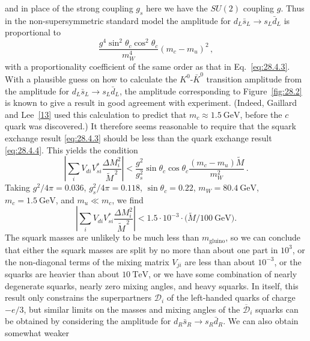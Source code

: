 and in place of the strong coupling \(g_s\) here we have the \(SU(2)\)
coupling \(g\). Thus in the non-supersymmetric standard model the
amplitude for
\(d_L\bar{s}_L\longrightarrow s_L\bar{d}_L\) is proportional to
\begin{equation}
  \frac{g^4\sin^2\theta_c\cos^2\theta_c}{m_W^4}
  (m_c-m_u)^2\,,
  \tag{28.4.4}\label{eq:28.4.4}
\end{equation}
with a proportionality coefficient of the same order as that in
Eq.~\eqref{eq:28.4.3}. With a plausible guess on how to calculate the
\(K^0\)-\(\bar K^0\) transition amplitude from the amplitude for
\(d_L\bar{s}_L\longrightarrow s_L\bar{d}_L\), the amplitude
corresponding to Figure~\ref{fig:28.2} is known to give a result in good
agreement with experiment. (Indeed, Gaillard and
Lee~\hyperref[ch28-ref-13]{[13]} used this calculation to predict that
\(m_c\approx1.5\ \mathrm{GeV}\), before the \(c\) quark was discovered.)
It therefore seems reasonable to require that the squark exchange result
\eqref{eq:28.4.3} should be less than the quark exchange result
\eqref{eq:28.4.4}. This yields the condition
\begin{equation}
  \left|
    \sum_iV_{di}V_{si}^*\frac{\Delta M_i^2}{\widetilde{M}^{\,2}}
  \right|
  <
  \frac{g^2}{g_s^2}\sin\theta_c\cos\theta_c
  \frac{(m_c-m_u)\widetilde{M}}{m_W^2}\,.
  \tag{28.4.5}\label{eq:28.4.5}
\end{equation}
Taking \(g^2/4\pi=0.036\), \(g_s^2/4\pi=0.118\),
\(\sin\theta_c=0.22\), \(m_W=80.4\ \mathrm{GeV}\),
\(m_c=1.5\ \mathrm{GeV}\), and \(m_u\ll m_c\), we find
\begin{equation}
  \left|
    \sum_iV_{di}V_{si}^*\frac{\Delta M_i^2}{\widetilde{M}^{\,2}}
  \right|
  <1.5\mathbin{\cdot}10^{-3}
  \mathbin{\cdot}
  \bigl(\widetilde{M}/100\ \mathrm{GeV}\bigr).
  \tag{28.4.6}\label{eq:28.4.6}
\end{equation}
The squark masses are unlikely to be much less than
\(m_{\mathrm{gluino}}\), so we can conclude that either the squark masses
are split by no more than about one part in \(10^3\), or the non-diagonal
terms of the mixing matrix \(V_{ji}\) are less than about \(10^{-3}\), or
the squarks are heavier than about \(10\ \mathrm{TeV}\), or we have some
combination of nearly degenerate squarks, nearly zero mixing angles, and
heavy squarks. In itself, this result only constrains the superpartners
\(\mathcal{D}_i\) of the left-handed quarks of charge \(-e/3\), but
similar limits on the masses and mixing angles of the
\(\overline{\mathcal{D}}_i\) squarks can be obtained by considering the
amplitude for
\(d_R\bar{s}_R\longrightarrow s_R\bar{d}_R\). We can also obtain
somewhat weaker

